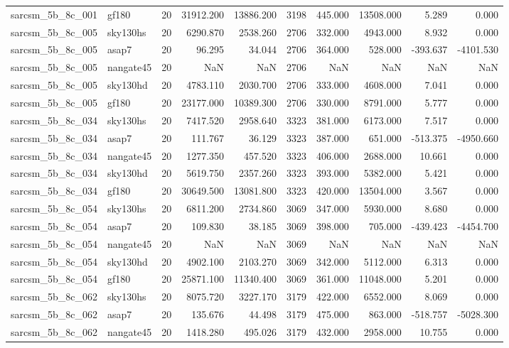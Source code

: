 \begin{tabular}{llrrrrrrrr}
sarcsm\_5b\_8c\_001 & gf180 & 20 & 31912.200 & 13886.200 & 3198 & 445.000 & 13508.000 & 5.289 & 0.000 \\
sarcsm\_5b\_8c\_005 & sky130hs & 20 & 6290.870 & 2538.260 & 2706 & 332.000 & 4943.000 & 8.932 & 0.000 \\
sarcsm\_5b\_8c\_005 & asap7 & 20 & 96.295 & 34.044 & 2706 & 364.000 & 528.000 & -393.637 & -4101.530 \\
sarcsm\_5b\_8c\_005 & nangate45 & 20 & NaN & NaN & 2706 & NaN & NaN & NaN & NaN \\
sarcsm\_5b\_8c\_005 & sky130hd & 20 & 4783.110 & 2030.700 & 2706 & 333.000 & 4608.000 & 7.041 & 0.000 \\
sarcsm\_5b\_8c\_005 & gf180 & 20 & 23177.000 & 10389.300 & 2706 & 330.000 & 8791.000 & 5.777 & 0.000 \\
sarcsm\_5b\_8c\_034 & sky130hs & 20 & 7417.520 & 2958.640 & 3323 & 381.000 & 6173.000 & 7.517 & 0.000 \\
sarcsm\_5b\_8c\_034 & asap7 & 20 & 111.767 & 36.129 & 3323 & 387.000 & 651.000 & -513.375 & -4950.660 \\
sarcsm\_5b\_8c\_034 & nangate45 & 20 & 1277.350 & 457.520 & 3323 & 406.000 & 2688.000 & 10.661 & 0.000 \\
sarcsm\_5b\_8c\_034 & sky130hd & 20 & 5619.750 & 2357.260 & 3323 & 393.000 & 5382.000 & 5.421 & 0.000 \\
sarcsm\_5b\_8c\_034 & gf180 & 20 & 30649.500 & 13081.800 & 3323 & 420.000 & 13504.000 & 3.567 & 0.000 \\
sarcsm\_5b\_8c\_054 & sky130hs & 20 & 6811.200 & 2734.860 & 3069 & 347.000 & 5930.000 & 8.680 & 0.000 \\
sarcsm\_5b\_8c\_054 & asap7 & 20 & 109.830 & 38.185 & 3069 & 398.000 & 705.000 & -439.423 & -4454.700 \\
sarcsm\_5b\_8c\_054 & nangate45 & 20 & NaN & NaN & 3069 & NaN & NaN & NaN & NaN \\
sarcsm\_5b\_8c\_054 & sky130hd & 20 & 4902.100 & 2103.270 & 3069 & 342.000 & 5112.000 & 6.313 & 0.000 \\
sarcsm\_5b\_8c\_054 & gf180 & 20 & 25871.100 & 11340.400 & 3069 & 361.000 & 11048.000 & 5.201 & 0.000 \\
sarcsm\_5b\_8c\_062 & sky130hs & 20 & 8075.720 & 3227.170 & 3179 & 422.000 & 6552.000 & 8.069 & 0.000 \\
sarcsm\_5b\_8c\_062 & asap7 & 20 & 135.676 & 44.498 & 3179 & 475.000 & 863.000 & -518.757 & -5028.300 \\
sarcsm\_5b\_8c\_062 & nangate45 & 20 & 1418.280 & 495.026 & 3179 & 432.000 & 2958.000 & 10.755 & 0.000 \\

\end{tabular}
